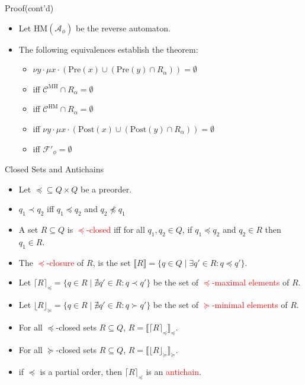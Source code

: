 \documentclass[12pt]{beamer}
\begin{document}
\begin{frame}{Proof(cont'd)}
	\begin{itemize}
		\item Let $\text{HM}(\mathcal{A}_{\phi})$ be the reverse automaton.
		\item The following equivalences establish the theorem:
		\begin{itemize}
				\item $\nu y \cdot \mu x \cdot (\text{Pre}(x) \cup (\text{Pre}(y) \cap R_{\alpha})) = \emptyset$
				\item iff $\mathcal{C}^{\text{MH}} \cap R_{\alpha} = \emptyset$
				\item iff $\mathcal{C}^{\text{HM}} \cap R_{\alpha} = \emptyset$
				\item iff $\nu y \cdot \mu x \cdot (\text{Post}(x) \cup (\text{Post}(y) \cap R_{\alpha})) = \emptyset$
				\item iff $\mathcal{F}'_{\phi} = \emptyset$
		\end{itemize}
	\end{itemize}
\end{frame}

\begin{frame}{Closed Sets and Antichains}
	\begin{itemize}
		\item Let $\preceq \subseteq Q \times Q$ be a preorder.
		\item $q_{1} \prec q_{2}$ iff $q_{1} \preceq q_{2}$ and $q_{2} \npreceq q_{1}$
		\item A set $R \subseteq Q$ is \textcolor{red}{$\preceq$-closed} iff for all $q_{1}, q_{2} \in Q$, if $q_{1} \preceq q_{2}$ and $q_{2} \in R$ then $q_{1} \in R$.
		\item The \textcolor{red}{$\preceq$-closure} of $R$, is the set $\llbracket R \rrbracket = \{q \in Q \mid \exists q' \in R : q \preceq q'\}$.
		\item Let $\lceil R \rceil_{\preceq} = \{q \in R \mid \nexists q' \in R : q \prec q'\}$ be the set of \textcolor{red}{$\preceq$-maximal elements} of $R$.
		\item Let $\lfloor R \rfloor_{\succeq} = \{q \in R \mid \nexists q' \in R : q \succ q'\}$ be the set of \textcolor{red}{$\succeq$-minimal elements} of $R$.
		\item For all $\preceq$-closed sets $R \subseteq Q$, $R = \llbracket \lceil R \rceil_{\preceq} \rrbracket_{\preceq}$.
		\item For all $\succeq$-closed sets $R \subseteq Q$, $R = \llbracket \lfloor R \rfloor_{\succeq} \rrbracket_{\succeq}$.
		\item if $\preceq$ is a partial order, then $\lceil R \rceil_{\preceq}$ is an \textcolor{red}{antichain}.
	\end{itemize}
\end{frame}
\end{document}
